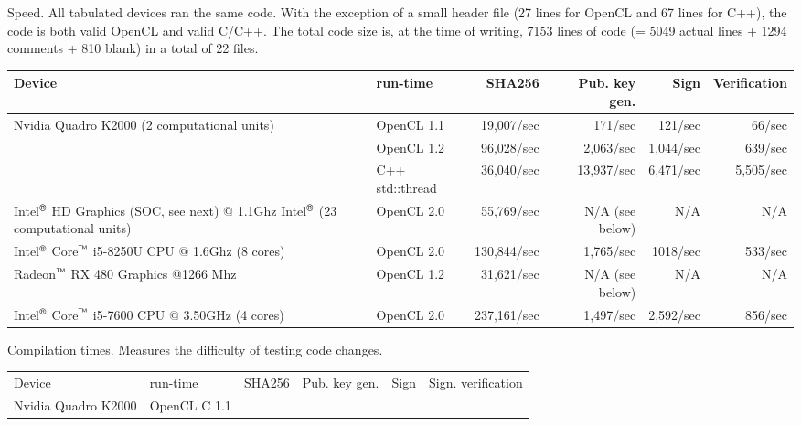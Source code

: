 \documentclass{article}
\begin{document}
Speed. All tabulated devices ran the same code. With the exception of a small header file (27 lines for OpenCL and 67 lines for C++), the code is both valid OpenCL and valid C/C++. The total code size is, at the time of writing, 7153 lines of code (= 5049 actual lines + 1294 comments + 810 blank) in a total of 22 files.

\noindent\begin{tabular}{|p{5.5cm}|l|r|r|r|r|}\hline
Device & run-time & SHA256 & Pub. key gen. & Sign & Verification\\\hline
Nvidia Quadro K2000 (2 computational units) & OpenCL 1.1 &19,007/sec & 171/sec & 121/sec & 66/sec\\\hline
{} & OpenCL 1.2 &96,028/sec & 2,063/sec& 1,044/sec & 639/sec\\
&C++ std::thread& 36,040/sec&13,937/sec&6,471/sec&5,505/sec \\\hline
Intel${}^{\text{\sffamily\textregistered}}$ HD Graphics (SOC, see next) @ 1.1Ghz Intel${}^{\text{\sffamily\textregistered}}$ (23 computational units) & OpenCL 2.0& 55,769/sec& N/A (see below) & N/A& N/A \\\hline
Intel${}^{\text{\sffamily\textregistered}}$ Core${}^{\text{\sffamily\texttrademark}}$ i5-8250U CPU @ 1.6Ghz (8 cores)& OpenCL 2.0 &130,844/sec& 1,765/sec &1018/sec& 533/sec\\\hline 
Radeon${}^{\text{\sffamily\texttrademark}}$ RX 480 Graphics @1266 Mhz &OpenCL 1.2& 31,621/sec& N/A (see below) & N/A& N/A
\\\hline

Intel${}^{\text{\sffamily\textregistered}}$ Core${}^{\text{\sffamily\texttrademark}}$ i5-7600 CPU @ 3.50GHz (4 cores) &OpenCL 2.0& 237,161/sec & 1,497/sec & 2,592/sec&  856/sec\\\hline

\end{tabular}

Compilation times. Measures the difficulty of testing code changes.

\begin{tabular}{llllll}
	Device & run-time & SHA256 & Pub. key gen. & Sign & Sign. verification\\
	Nvidia Quadro K2000 & OpenCL C 1.1 & &
\end{tabular}
\end{document}
